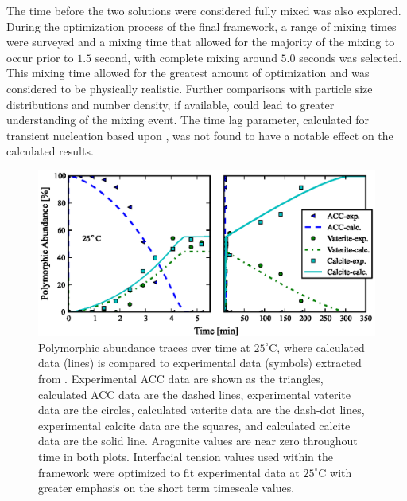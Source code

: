 \documentclass[preprint,3p,a4paper,times,12pt,authoryear]{elsarticle}
\begin{document}
The time before the two solutions were considered fully mixed was also explored.  During the optimization process of the final framework, a range of mixing times were surveyed and a mixing time that allowed for the majority of the mixing to occur prior to $1.5$ second, with complete mixing around $5.0$ seconds was selected.  This mixing time allowed for the greatest amount of optimization and was considered to be physically realistic.  Further comparisons with particle size distributions and number density, if available, could lead to greater understanding of the mixing event.  The time lag parameter, calculated for transient nucleation based upon \citep{Kashchiev1969}, was not found to have a notable effect on the calculated results.


\begin{figure}[h!tbp]
\begin{center}
\includegraphics{fig_5_PA_optimized_tensions_25C}
\end{center}
\caption{Polymorphic abundance traces over time at $25^\circ$C, where calculated data (lines) is compared to experimental data (symbols) extracted from \citep{Ogino1987}.  Experimental ACC data are shown as the triangles, calculated ACC data are the dashed lines, experimental vaterite data are the circles, calculated vaterite data are the dash-dot lines, experimental calcite data are the squares, and calculated calcite data are the solid line.  Aragonite values are near zero throughout time in both plots.  Interfacial tension values used within the framework were optimized to fit experimental data at $25^\circ$C with greater emphasis on the short term timescale values.}
\label{optimized_25}
\end{figure}
\end{document}
